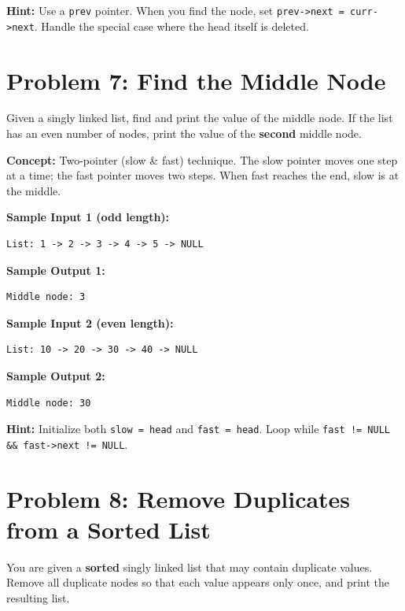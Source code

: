 \documentclass[12pt, a4paper]{article}
\begin{document}
\textbf{Hint:} Use a \texttt{prev} pointer. When you find the node, set \texttt{prev->next = curr->next}. Handle the special case where the head itself is deleted.

\newpage

\section*{Problem 7: Find the Middle Node}

\begin{problembox}
Given a singly linked list, find and print the value of the middle node. If the list has an even number of nodes, print the value of the \textbf{second} middle node.
\end{problembox}

\textbf{Concept:} Two-pointer (slow \& fast) technique. The slow pointer moves one step at a time; the fast pointer moves two steps. When fast reaches the end, slow is at the middle.

\textbf{Sample Input 1 (odd length):}
\begin{lstlisting}
List: 1 -> 2 -> 3 -> 4 -> 5 -> NULL
\end{lstlisting}
\textbf{Sample Output 1:}
\begin{lstlisting}
Middle node: 3
\end{lstlisting}

\textbf{Sample Input 2 (even length):}
\begin{lstlisting}
List: 10 -> 20 -> 30 -> 40 -> NULL
\end{lstlisting}
\textbf{Sample Output 2:}
\begin{lstlisting}
Middle node: 30
\end{lstlisting}

\textbf{Hint:} Initialize both \texttt{slow = head} and \texttt{fast = head}. Loop while \texttt{fast != NULL \&\& fast->next != NULL}.

\hrulefill

\section*{Problem 8: Remove Duplicates from a Sorted List}

\begin{problembox}
You are given a \textbf{sorted} singly linked list that may contain duplicate values. Remove all duplicate nodes so that each value appears only once, and print the resulting list.
\end{problembox}
\end{document}
